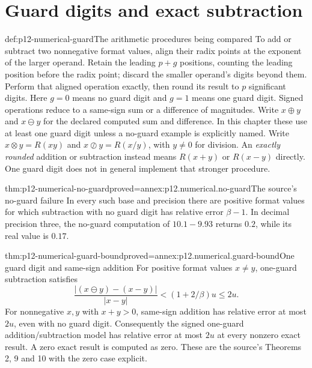 \section{Guard digits and exact subtraction}

\begin{hbdefinition}{def:p12-numerical-guard}{The arithmetic procedures being compared}
To add or subtract two nonnegative format values, align their radix
points at the exponent of the larger operand. Retain the leading \(p+g\)
positions, counting the leading position before the radix point; discard
the smaller operand's digits beyond them. Perform that aligned operation
exactly, then round its result to \(p\) significant digits. Here \(g=0\)
means no guard digit and \(g=1\) means one guard digit. Signed operations
reduce to a same-sign sum or a difference of magnitudes.
Write \(x\oplus y\) and \(x\ominus y\) for the declared computed
sum and difference. In this chapter these use at least one guard digit
unless a no-guard example is explicitly named. Write
\(x\otimes y=R(xy)\) and \(x\oslash y=R(x/y)\), with \(y\ne0\)
for division. An \emph{exactly rounded} addition or subtraction instead
means \(R(x+y)\) or \(R(x-y)\) directly. One guard digit does not
in general implement that stronger procedure.
\end{hbdefinition}

\begin{hbtheorem}{thm:p12-numerical-no-guard}{proved=annex:p12.numerical.no-guard}{The source's no-guard failure}
In every such base and precision there are positive format values for
which subtraction with no guard digit has relative error \(\beta-1\).
In decimal precision three, the no-guard computation of \(10.1-9.93\)
returns \(0.2\), while its real value is \(0.17\).
\end{hbtheorem}

\begin{hbtheorem}{thm:p12-numerical-guard-bound}{proved=annex:p12.numerical.guard-bound}{One guard digit and same-sign addition}
For positive format values \(x\ne y\), one-guard subtraction satisfies
\[
 \frac{|(x\ominus y)-(x-y)|}{|x-y|}
 <(1+2/\beta)u\leq2u.
\]
For nonnegative \(x,y\) with \(x+y>0\), same-sign addition has relative
error at most \(2u\), even with no guard digit. Consequently the signed
one-guard addition/subtraction model has relative error at most \(2u\)
at every nonzero exact result. A zero exact result is computed as zero.
These are the source's Theorems 2, 9 and 10 with the zero case explicit.
\end{hbtheorem}

